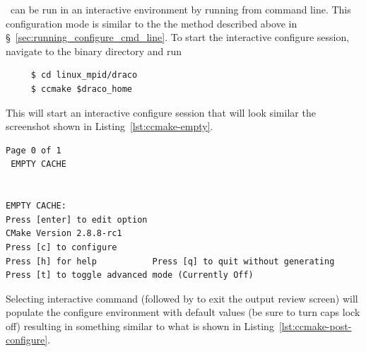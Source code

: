 \cmake\ can be run in an interactive environment by running  from command line.  This configuration mode is similar to the the method described above in \S~\ref{sec:running_configure_cmd_line}.  To start the interactive configure session, navigate to the binary directory and run 
\begin{verbatim}
     $ cd linux_mpid/draco
     $ ccmake $draco_home
\end{verbatim}
This will start an interactive configure session that will look similar the screenshot shown in Listing~\ref{lst:ccmake-empty}.
\begin{lstlisting}[basicstyle=\footnotesize, xleftmargin=0.0in, xrightmargin=0.0in, caption={The \comp{ccmake} screen prior to running configure.}, float=htn, label={lst:ccmake-empty}]
                                                     Page 0 of 1
 EMPTY CACHE


EMPTY CACHE:                                                                              
Press [enter] to edit option                                       CMake Version 2.8.8-rc1
Press [c] to configure
Press [h] for help           Press [q] to quit without generating
Press [t] to toggle advanced mode (Currently Off)
\end{lstlisting}
Selecting interactive command \comp{[c]} (followed by \comp{[e]} to exit the output review screen) 
will populate the configure environment with default values (be sure to turn caps lock off) resulting in something similar to what is shown in Listing~\ref{lst:ccmake-post-configure}.
